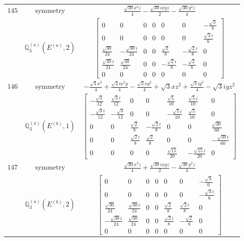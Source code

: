 \documentclass[fleqn,8pt,landscape]{jsarticle}
\begin{document}
\begin{longtable}{ccc}
$ 145 $ & $ \text{symmetry} $ & $ \frac{\sqrt{30} x^{2} z}{4} - \frac{\sqrt{30} i x y z}{2} - \frac{\sqrt{30} y^{2} z}{4} $ \\
$  $ & $ \mathbb{Q}_{3}^{(a)}(E^{(a)},2) $ & $ \begin{bmatrix} 0 & 0 & 0 & 0 & 0 & 0 & - \frac{\sqrt{3}}{6} \\ 0 & 0 & 0 & 0 & 0 & 0 & \frac{\sqrt{3} i}{6} \\ \frac{\sqrt{30}}{24} & - \frac{\sqrt{30} i}{24} & 0 & 0 & \frac{\sqrt{2}}{8} & - \frac{\sqrt{2} i}{8} & 0 \\ \frac{\sqrt{30} i}{24} & \frac{\sqrt{30}}{24} & 0 & 0 & - \frac{\sqrt{2} i}{8} & - \frac{\sqrt{2}}{8} & 0 \\ 0 & 0 & 0 & 0 & 0 & 0 & 0 \end{bmatrix} $ \\ \hline
$ 146 $ & $ \text{symmetry} $ & $ - \frac{\sqrt{3} x^{3}}{4} + \frac{\sqrt{3} i x^{2} y}{4} - \frac{\sqrt{3} x y^{2}}{4} + \sqrt{3} x z^{2} + \frac{\sqrt{3} i y^{3}}{4} - \sqrt{3} i y z^{2} $ \\
$  $ & $ \mathbb{Q}_{3}^{(a)}(E^{(b)},1) $ & $ \begin{bmatrix} - \frac{\sqrt{3}}{12} & \frac{\sqrt{3} i}{12} & 0 & 0 & \frac{\sqrt{5}}{10} & \frac{\sqrt{5} i}{10} & 0 \\ - \frac{\sqrt{3} i}{12} & - \frac{\sqrt{3}}{12} & 0 & 0 & - \frac{\sqrt{5} i}{10} & \frac{\sqrt{5}}{10} & 0 \\ 0 & 0 & \frac{\sqrt{2}}{8} & - \frac{\sqrt{2} i}{8} & 0 & 0 & \frac{\sqrt{30}}{60} \\ 0 & 0 & \frac{\sqrt{2} i}{8} & \frac{\sqrt{2}}{8} & 0 & 0 & - \frac{\sqrt{30} i}{60} \\ 0 & 0 & 0 & 0 & \frac{\sqrt{15}}{20} & - \frac{\sqrt{15} i}{20} & 0 \end{bmatrix} $ \\ \hline
$ 147 $ & $ \text{symmetry} $ & $ \frac{\sqrt{30} x^{2} z}{4} + \frac{\sqrt{30} i x y z}{2} - \frac{\sqrt{30} y^{2} z}{4} $ \\
$  $ & $ \mathbb{Q}_{3}^{(a)}(E^{(b)},2) $ & $ \begin{bmatrix} 0 & 0 & 0 & 0 & 0 & 0 & - \frac{\sqrt{3}}{6} \\ 0 & 0 & 0 & 0 & 0 & 0 & - \frac{\sqrt{3} i}{6} \\ \frac{\sqrt{30}}{24} & \frac{\sqrt{30} i}{24} & 0 & 0 & \frac{\sqrt{2}}{8} & \frac{\sqrt{2} i}{8} & 0 \\ - \frac{\sqrt{30} i}{24} & \frac{\sqrt{30}}{24} & 0 & 0 & \frac{\sqrt{2} i}{8} & - \frac{\sqrt{2}}{8} & 0 \\ 0 & 0 & 0 & 0 & 0 & 0 & 0 \end{bmatrix} $ \\ \hline

\end{longtable}
\end{document}
